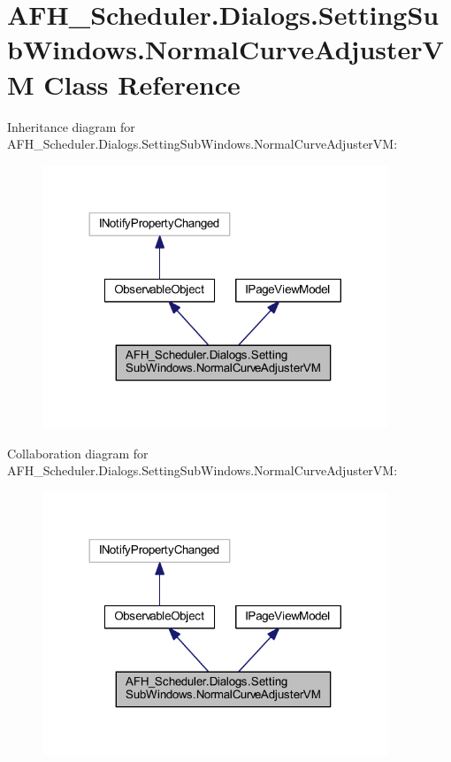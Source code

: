 \section{A\+F\+H\+\_\+\+Scheduler.\+Dialogs.\+Setting\+Sub\+Windows.\+Normal\+Curve\+Adjuster\+VM Class Reference}
\label{class_a_f_h___scheduler_1_1_dialogs_1_1_setting_sub_windows_1_1_normal_curve_adjuster_v_m}


Inheritance diagram for A\+F\+H\+\_\+\+Scheduler.\+Dialogs.\+Setting\+Sub\+Windows.\+Normal\+Curve\+Adjuster\+VM\+:
\nopagebreak
\begin{figure}[H]
\begin{center}
\leavevmode
\includegraphics[width=293pt]{class_a_f_h___scheduler_1_1_dialogs_1_1_setting_sub_windows_1_1_normal_curve_adjuster_v_m__inherit__graph}
\end{center}
\end{figure}


Collaboration diagram for A\+F\+H\+\_\+\+Scheduler.\+Dialogs.\+Setting\+Sub\+Windows.\+Normal\+Curve\+Adjuster\+VM\+:
\nopagebreak
\begin{figure}[H]
\begin{center}
\leavevmode
\includegraphics[width=293pt]{class_a_f_h___scheduler_1_1_dialogs_1_1_setting_sub_windows_1_1_normal_curve_adjuster_v_m__coll__graph}
\end{center}
\end{figure}
